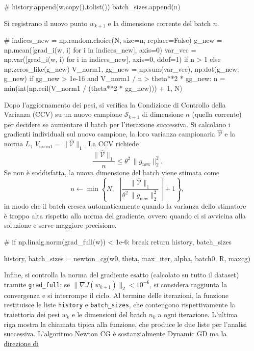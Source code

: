 \documentclass[a4paper,12pt]{article}
\begin{document}
\begin{pythoncode}[title= Newton-CG]

#
        history.append(w.copy().tolist())
        batch_sizes.append(n)
\end{pythoncode}
Si registrano il nuovo punto \(w_{k+1}\) e la dimensione corrente del batch \(n\).
\begin{pythoncode}[title= Newton-CG]

#
        indices_new = np.random.choice(N, size=n, replace=False)
        g_new = np.mean([grad_i(w, i) for i in indices_new], axis=0)
        var_vec = np.var([grad_i(w, i) for i in indices_new], axis=0, ddof=1) if n > 1 else np.zeros_like(g_new)
        V_norm1, gg_new = np.sum(var_vec), np.dot(g_new, g_new)
        if gg_new > 1e-16 and V_norm1 / n > theta**2 * gg_new:
            n = min(int(np.ceil(V_norm1 / (theta**2 * gg_new))) + 1, N)
\end{pythoncode}
Dopo l'aggiornamento dei pesi, si verifica la Condizione di Controllo della Varianza (CCV) su un nuovo campione \(\mathcal{S}_{k+1}\) di dimensione \(n\) (quella corrente) per decidere se aumentare il batch per l'iterazione successiva. Si calcolano i gradienti individuali sul nuovo campione, la loro varianza campionaria \(\widehat{\mathcal{V}}\) e la norma \(L_1\) \(V_{\text{norm1}} = \|\widehat{\mathcal{V}}\|_1\). La CCV richiede
\[
\frac{\|\widehat{\mathcal{V}}\|_1}{n} \le \theta^2 \,\|g_{\text{new}}\|_2^2.
\]
Se non è soddisfatta, la nuova dimensione del batch viene stimata come
\[
n \leftarrow \min\left\{N,\; \left\lceil \frac{\|\widehat{\mathcal{V}}\|_1}{\theta^2\,\|g_{\text{new}}\|_2^2} \right\rceil + 1 \right\},
\]
in modo che il batch cresca automaticamente quando la varianza dello stimatore è troppo alta rispetto alla norma del gradiente, ovvero quando ci si avvicina alla soluzione e serve maggiore precisione.

\begin{pythoncode}[title= Newton-CG]

#
        if np.linalg.norm(grad_full(w)) < 1e-6:
            break
    return history, batch_sizes

history, batch_sizes = newton_cg(w0, theta, max_iter, alpha, batch0, R, maxcg)
\end{pythoncode}
Infine, si controlla la norma del gradiente esatto (calcolato su tutto il dataset) tramite \texttt{grad\_full}; se \(\|\nabla J(w_{k+1})\|_2 < 10^{-6}\), si considera raggiunta la convergenza e si interrompe il ciclo. Al termine delle iterazioni, la funzione restituisce le liste \texttt{history} e \texttt{batch\_sizes}, che contengono rispettivamente la traiettoria dei pesi \(w_k\) e le dimensioni del batch \(n_k\) a ogni iterazione. L'ultima riga mostra la chiamata tipica alla funzione, che produce le due liste per l'analisi successiva.
\underline{L'algoritmo Newton CG è sostanzialmente Dynamic GD ma la direzione di}
\end{document}

